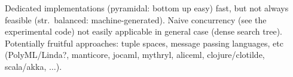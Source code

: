 \documentclass[index=totoc,bibliography=totoc]{scrartcl}
\DeclareMathOperator*{\argmin}{arg\,min}
\begin{document}
Dedicated implementations (pyramidal: bottom up easy) fast, but not always feasible (str.~balanced: machine-generated).
Naive concurrency (see the {\ttfamily experimental} code) not easily applicable in general case (dense search tree).
Potentially fruitful approaches: tuple spaces, message passing languages, etc
(PolyML/Linda?, manticore, jocaml, mythryl, aliceml, clojure/clotilde, scala/akka, $\ldots$).

%

\end{document}
